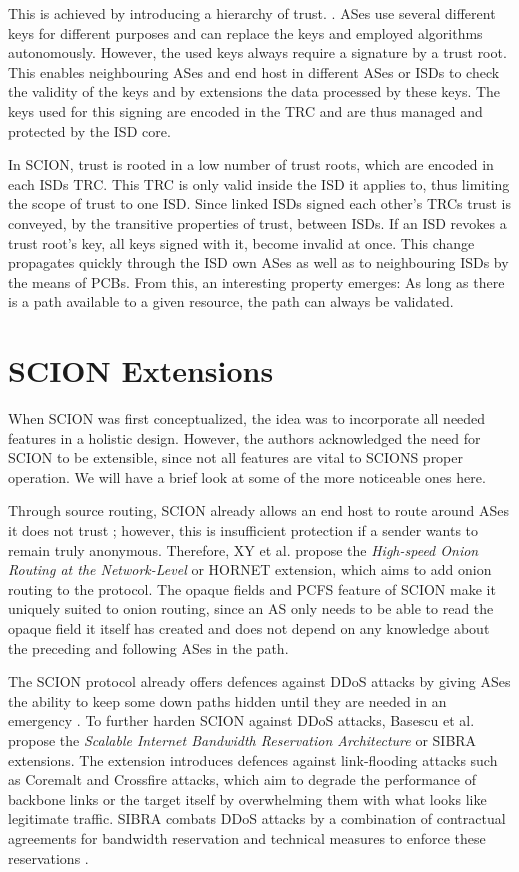 \documentclass[../eva1_scion.tex]{subfiles}
\begin{document}
    This is achieved by introducing a hierarchy of trust. \cite{scion_2011}. ASes use several different keys for different purposes and can replace the keys and employed algorithms autonomously. However, the used keys always require a signature by a trust root. This enables neighbouring ASes and end host in different ASes or ISDs to check the validity of the keys and by extensions the data processed by these keys. The keys used for this signing are encoded in the TRC and are thus managed and protected by the ISD core.

    In SCION, trust is rooted in a low number of trust roots, which are encoded in each ISDs TRC. This TRC is only valid inside the ISD it applies to, thus limiting the scope of trust to one ISD. Since linked ISDs signed each other's TRCs trust is conveyed, by the transitive properties of trust, between ISDs. If an ISD revokes a trust root's key, all keys signed with it, become invalid at once. This change propagates quickly through the ISD own ASes as well as to neighbouring ISDs by the means of PCBs. From this, an interesting property emerges: As long as there is a path available to a given resource, the path can always be validated.

    \section{SCION Extensions}
    When SCION was first conceptualized, the idea was to incorporate all needed features in a holistic design. However, the authors acknowledged the need for SCION to be extensible, since not all features are vital to SCIONS proper operation. We will have a brief look at some of the more noticeable ones here.

    Through source routing, SCION already allows an end host to route around ASes it does not trust \cite{scion_2011}; however, this is insufficient protection if a sender wants to remain truly anonymous. Therefore, XY et al. propose the \textit{High-speed Onion Routing at the Network-Level} \cite{hornet_2018} or HORNET extension, which aims to add onion routing \cite{onion_routing} to the protocol. The opaque fields and PCFS feature of SCION make it uniquely suited to onion routing, since an AS only needs to be able to read the opaque field it itself has created and does not depend on any knowledge about the preceding and following ASes in the path.

    The SCION protocol already offers defences against DDoS attacks by giving ASes the ability to keep some down paths hidden until they are needed in an emergency \cite{scion_2015}. To further harden SCION against DDoS attacks, Basescu et al. propose the \textit{Scalable Internet Bandwidth Reservation Architecture} \cite{sibra} or SIBRA extensions. The extension introduces defences against link-flooding attacks such as Coremalt \cite{coremelt} and Crossfire \cite{crossfire} attacks, which aim to degrade the performance of backbone links or the target itself by overwhelming them with what looks like legitimate traffic. SIBRA combats DDoS attacks by a combination of contractual agreements for bandwidth reservation and technical measures to enforce these reservations \cite{sibra}.
\end{document}
